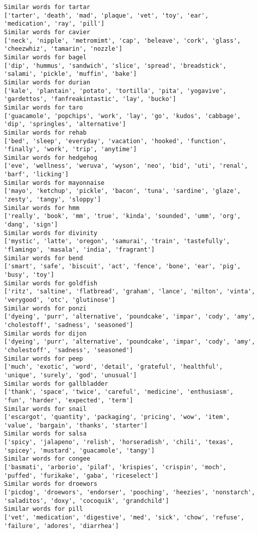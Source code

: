 \documentclass[11pt]{article}
\begin{document}
\begin{Verbatim}[commandchars=\\\{\}]
Similar words for tartar
['tarter', 'death', 'mad', 'plaque', 'vet', 'toy', 'ear', 'medication', 'ray', 'pill']
Similar words for cavier
['neck', 'nipple', 'metromimt', 'cap', 'beleave', 'cork', 'glass', 'cheezwhiz', 'tamarin', 'nozzle']
Similar words for bagel
['dip', 'hummus', 'sandwich', 'slice', 'spread', 'breadstick', 'salami', 'pickle', 'muffin', 'bake']
Similar words for durian
['kale', 'plantain', 'potato', 'tortilla', 'pita', 'yogavive', 'gardettos', 'fanfreakintastic', 'lay', 'bucko']
Similar words for taro
['guacamole', 'popchips', 'work', 'lay', 'go', 'kudos', 'cabbage', 'dip', 'springles', 'alternative']
Similar words for rehab
['bed', 'sleep', 'everyday', 'vacation', 'hooked', 'function', 'finally', 'work', 'trip', 'anytime']
Similar words for hedgehog
['eve', 'wellness', 'weruva', 'wyson', 'neo', 'bid', 'uti', 'renal', 'barf', 'licking']
Similar words for mayonnaise
['mayo', 'ketchup', 'pickle', 'bacon', 'tuna', 'sardine', 'glaze', 'zesty', 'tangy', 'sloppy']
Similar words for hmm
['really', 'book', 'mm', 'true', 'kinda', 'sounded', 'umm', 'org', 'dang', 'sign']
Similar words for divinity
['mystic', 'latte', 'oregon', 'samurai', 'train', 'tastefully', 'flamingo', 'masala', 'india', 'fragrant']
Similar words for bend
['smart', 'safe', 'biscuit', 'act', 'fence', 'bone', 'ear', 'pig', 'busy', 'toy']
Similar words for goldfish
['ritz', 'saltine', 'flatbread', 'graham', 'lance', 'milton', 'vinta', 'verygood', 'otc', 'glutinose']
Similar words for ponzi
['dyeing', 'purr', 'alternative', 'poundcake', 'impar', 'cody', 'amy', 'cholestoff', 'sadness', 'seasoned']
Similar words for dijon
['dyeing', 'purr', 'alternative', 'poundcake', 'impar', 'cody', 'amy', 'cholestoff', 'sadness', 'seasoned']
Similar words for peep
['much', 'exotic', 'word', 'detail', 'grateful', 'healthful', 'unique', 'surely', 'god', 'unusual']
Similar words for gallbladder
['thank', 'space', 'twice', 'careful', 'medicine', 'enthusiasm', 'fun', 'harder', 'expected', 'term']
Similar words for snail
['escargot', 'quantity', 'packaging', 'pricing', 'wow', 'item', 'value', 'bargain', 'thanks', 'starter']
Similar words for salsa
['spicy', 'jalapeno', 'relish', 'horseradish', 'chili', 'texas', 'spicey', 'mustard', 'guacamole', 'tangy']
Similar words for congee
['basmati', 'arborio', 'pilaf', 'krispies', 'crispin', 'moch', 'puffed', 'furikake', 'gaba', 'riceselect']
Similar words for droewors
['picdog', 'droewors', 'endorser', 'pooching', 'heezies', 'nonstarch', 'saladitos', 'doxy', 'cocoquik', 'grandchild']
Similar words for pill
['vet', 'medication', 'digestive', 'med', 'sick', 'chow', 'refuse', 'failure', 'adores', 'diarrhea']

\end{Verbatim}
\end{document}
